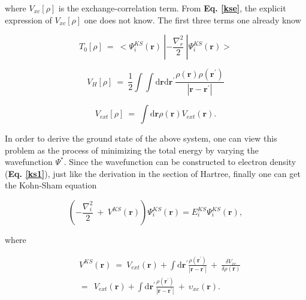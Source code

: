 \documentclass[a4paper, 12pt, titlepage,oneside,drop]{kthesis}
\begin{document}
where $V_\textit{xc}[\rho]$  is the exchange-correlation term. From \textbf{Eq. \ref{kse}}, the explicit expression of $V_\textit{xc}[\rho]$ one does not know. 
The first three terms one already know

\begin{equation}
 T_{0}[\rho]\ = \ < \Psi_{i}^{\textit{KS}}(\textbf{r}) \ | -\frac{\nabla^{2}_{r}}{2} \ | \Psi_{i}^{\textit{KS}}(\textbf{r}) >
\end{equation}

\begin{equation}
V_\textit{H}[\rho] \ = \ \frac{1}{2} \int \int \mathrm{d} {\textbf{r}} \mathrm{d}{\textbf{r}^{\prime}} \frac{\rho({\textbf{r}})\rho(\textbf{r}^{\prime})}{|{\textbf{r}}-{\textbf{r}}^{\prime}|}
\end{equation}

\begin{equation}
V_\textit{ext}[\rho]\ = \ \int \mathrm{d}{\textbf{r}} \rho(\textbf{r}) V_\textit{ext}(\textbf{r}). 
\end{equation}

In order to derive the ground state of the above system, one can view this problem as the process of minimizing the total energy by varying the wavefunction $\Psi^*$. Since
 the wavefunction can be constructed to electron density (\textbf{Eq. \ref{ks1}}), just like the derivation in the section of Hartree, finally one can get the Kohn-Sham equation

\begin{equation}\label{aaa}
 (-\frac{\nabla^{2}_{i}}{2}\ + \ V^\textit{KS}(\textbf{r})) \Psi^{\textit{KS}}_{\textit{i}}(\textbf{r}) = E^{\textit{KS}}_{\textit{i}} \Psi^{\textit{KS}}_{\textit{i}}(\textbf{r}),
\end{equation}

where

\begin{equation}\begin{split}
&\ V^\textit{KS}(\textbf{r}) \ = \ V_\textit{ext}(\textbf{r}) + \int \mathrm{d}{\textbf{r}^{\prime}}  \frac{\rho(\textbf{r}^{\prime})}{|{\textbf{r}}-{\textbf{r}}^{\prime}|} \ + \ \frac{\delta{V_\textit{xc}}}{\delta{\rho(\textbf{r})}} \\
&\ = \ \ V_\textit{ext}(\textbf{r}) + \int \mathrm{d}{\textbf{r}^{\prime}}  \frac{\rho(\textbf{r}^{\prime})}{|{\textbf{r}}-{\textbf{r}}^{\prime}|} \ + \ \upsilon_\textit{xc}(\textbf{r}).
\end{split}
\end{equation}
\end{document}
